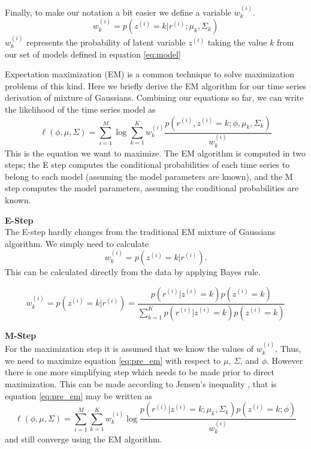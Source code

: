 Finally, to make our notation a bit easier we define a variable $w^{(i)}_{k}$.  
\begin{equation}
w_{k}^{(i)} = p(z^{(i)} = k|r^{(i)};\mu_{k}, \Sigma_{k})
\end{equation}
\noindent
$w_{k}^{(i)}$ represents the probability of latent variable $z^{(i)}$ taking the value $k$ from our set of models defined in equation \ref{eq:model}

Expectation maximization (EM) is a common technique to solve maximization problems of this kind.  Here we briefly derive the EM algorithm for our time series derivation of mixture of Gaussians.  Combining our equations so far, we can write the likelihood of the time series model as
\begin{equation}
\label{eq:pre_em}
\ell(\phi, \mu, \Sigma) = \sum_{i = 1}^{M}\log \sum_{k = 1}^{K}w_{k}^{(i)}\frac{p(r^{(i)}, z^{(i)}=k;\phi, \mu_{k}, \Sigma_{k})}{w_{k}^{(i)}}
\end{equation}
\noindent
This is the equation we want to maximize.  The EM algorithm is computed in two steps; the E step computes the conditional probabilities of each time series to belong to each model  (assuming the model parameters are known), and the M step computes the model parameters, assuming the conditional probabilities are known.

\bigskip
\noindent
\textbf{E-Step} \\
The E-step hardly changes from the traditional EM mixture of Gaussians algorithm.  We simply need to calculate 
\begin{equation}
w^{(i)}_{k} = p(z^{(i)} = k|r^{(i)}).
\end{equation}
\noindent
This can be calculated directly from the data by applying Bayes rule.

\begin{equation}
w^{(i)}_{k} = p(z^{(i)} = k|r^{(i)}) = \frac{p(r^{(i)}|z^{(i)}=k)p(z^{(i)}=k)}
						{\sum_{k=1}^{K}p(r^{(i)}|z^{(i)}=k)p(z^{(i)}=k)}
\end{equation}


\bigskip
\noindent
\textbf{M-Step} \\
For the maximization step it is assumed that we know the values of $w_{k}^{(i)}$.  Thus, we need to maximize equation \ref{eq:pre_em} with respect to $\mu$, $\Sigma$, and $\phi$.  However there is one more simplifying step which needs to be made prior to direct maximization.  This can be made according to Jensen's inequality \cite{Jensen1906}, that is equation \ref{eq:pre_em} may be written as 
\begin{equation}
\label{eq:em_likelihood}
\ell(\phi, \mu, \Sigma) = \sum_{i = 1}^{M}\sum_{k = 1}^{K}w_{k}^{(i)}\log \frac{p(r^{(i)}|z^{(i)}=k;\mu_{k}, \Sigma_{k})p(z^{(i)} = k;\phi)}{w_{k}^{(i)}}
\end{equation}
and still converge using the EM algorithm.

